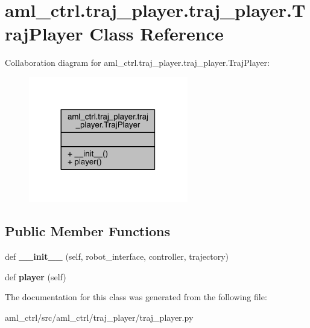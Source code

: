 \hypertarget{classaml__ctrl_1_1traj__player_1_1traj__player_1_1_traj_player}{}\section{aml\+\_\+ctrl.\+traj\+\_\+player.\+traj\+\_\+player.\+Traj\+Player Class Reference}
\label{classaml__ctrl_1_1traj__player_1_1traj__player_1_1_traj_player}


Collaboration diagram for aml\+\_\+ctrl.\+traj\+\_\+player.\+traj\+\_\+player.\+Traj\+Player\+:\nopagebreak
\begin{figure}[H]
\begin{center}
\leavevmode
\includegraphics[width=197pt]{classaml__ctrl_1_1traj__player_1_1traj__player_1_1_traj_player__coll__graph}
\end{center}
\end{figure}
\subsection*{Public Member Functions}
\begin{DoxyCompactItemize}
\item 
\hypertarget{classaml__ctrl_1_1traj__player_1_1traj__player_1_1_traj_player_a8d06a4791cc66440c2863e0695b81185}{}\label{classaml__ctrl_1_1traj__player_1_1traj__player_1_1_traj_player_a8d06a4791cc66440c2863e0695b81185} 
def {\bfseries \+\_\+\+\_\+init\+\_\+\+\_\+} (self, robot\+\_\+interface, controller, trajectory)
\item 
\hypertarget{classaml__ctrl_1_1traj__player_1_1traj__player_1_1_traj_player_a55ee18daa11215053dec208f8f4020c1}{}\label{classaml__ctrl_1_1traj__player_1_1traj__player_1_1_traj_player_a55ee18daa11215053dec208f8f4020c1} 
def {\bfseries player} (self)
\end{DoxyCompactItemize}


The documentation for this class was generated from the following file\+:\begin{DoxyCompactItemize}
\item 
aml\+\_\+ctrl/src/aml\+\_\+ctrl/traj\+\_\+player/traj\+\_\+player.\+py\end{DoxyCompactItemize}
